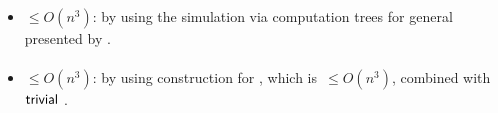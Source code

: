\paragraph{\OMODLA{}\tto\TDFA}\label{cost:OM1DLAto2DFAu}
\begin{itemize}
	\item $\le O(n^3)$: by using the simulation via computation trees for general \OMODLAs presented by .
\end{itemize}
\paragraph{\OMODLA{}\tto\TNFA}
\begin{itemize}
	\item $\le O(n^3)$: by using construction for \hyperref[cost:OM1DLAto2DFAu]{\OMODLA{}\tto\TDFA}, which is~$\le O(n^3)$, combined with~$\mathsf{trivial}$ \TDFA{}\tto\TNFA.
\end{itemize}
